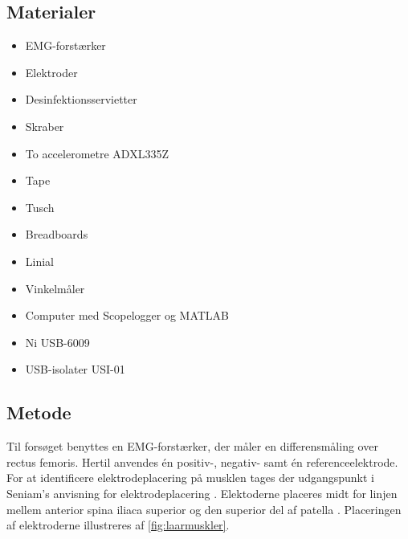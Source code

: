 \subsection{Materialer} 
\begin{itemize}
\item EMG-forstærker
\item Elektroder 
\item Desinfektionsservietter
\item Skraber
\item To accelerometre ADXL335Z
\item Tape
\item Tusch
\item Breadboards
\item Linial 
\item Vinkelmåler
\item Computer med Scopelogger og MATLAB
\item Ni USB-6009
\item USB-isolater USI-01
\end{itemize}

\subsection{Metode}

Til forsøget benyttes en EMG-forstærker, der måler en differensmåling over rectus femoris. Hertil anvendes én positiv-, negativ- samt én referenceelektrode. 
For at identificere elektrodeplacering på musklen tages der udgangspunkt i Seniam's anvisning for elektrodeplacering \citep{seniam2016}. 
Elektoderne placeres midt for linjen mellem anterior spina iliaca superior og den superior del af patella \citep{seniam2016}. Placeringen af elektroderne illustreres af \autoref{fig:laarmuskler}.


